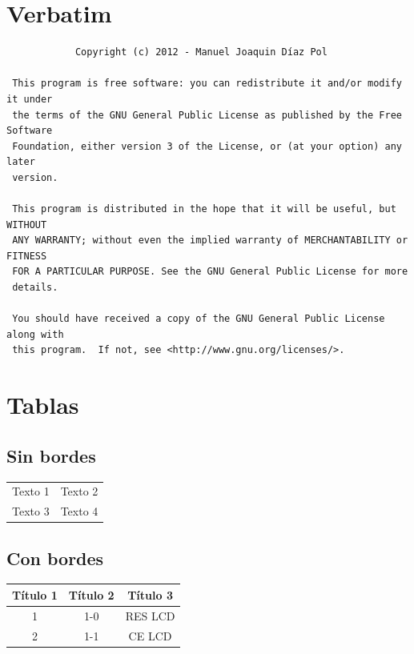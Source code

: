 \documentclass[11pt,spanish]{report}
\begin{document}
		\section{Verbatim}
			\begin{verbatim}
			Copyright (c) 2012 - Manuel Joaquin Díaz Pol

 This program is free software: you can redistribute it and/or modify it under
 the terms of the GNU General Public License as published by the Free Software
 Foundation, either version 3 of the License, or (at your option) any later
 version.

 This program is distributed in the hope that it will be useful, but WITHOUT
 ANY WARRANTY; without even the implied warranty of MERCHANTABILITY or FITNESS
 FOR A PARTICULAR PURPOSE. See the GNU General Public License for more
 details.

 You should have received a copy of the GNU General Public License along with
 this program.  If not, see <http://www.gnu.org/licenses/>.
\end{verbatim}

		\section{Tablas}
			\subsection{Sin bordes}
				\begin{tabular}{ll}
					Texto 1 & Texto 2\\
					Texto 3 & Texto 4\\
				\end{tabular}
			
			\subsection{Con bordes}
				\begin{center}
				\begin{tabular}{|c|c|c|}
					\hline
	 				\textbf{Título 1}& \textbf{Título 2} & \textbf{Título 3}\\
					\hline
					1 & 1-0 & RES LCD\\
					\hline
					2 & 1-1 & CE LCD\\
					\hline
						
				\end{tabular}
				\end{center}
			
\end{document}
